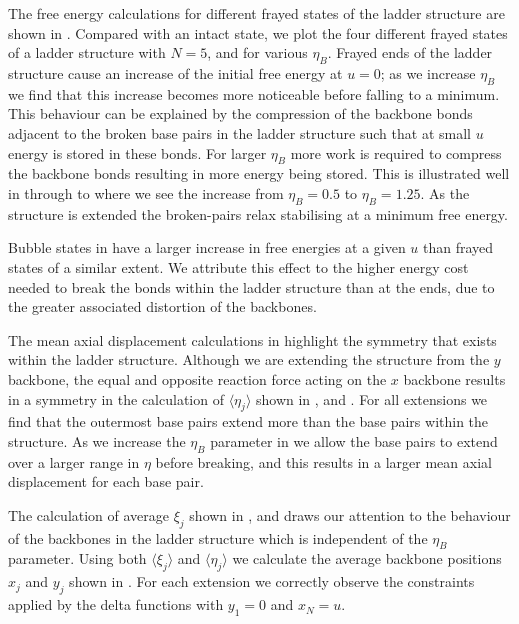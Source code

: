 The free energy calculations for different frayed states of the ladder structure are shown in . Compared with an intact state, we plot the four different frayed states of a ladder structure with $N=5$, and for various $\eta_B$. Frayed ends of the ladder structure cause an increase of the initial free energy at $u=0$; as we increase $\eta_B$ we find that this increase becomes more noticeable before falling to a minimum. This behaviour can be explained by the compression of the backbone bonds adjacent to the broken base pairs in the ladder structure such that at small $u$ energy is stored in these bonds. For larger $\eta_B$ more work is required to compress the backbone bonds resulting in more energy being stored. This is illustrated well in  through to  where we see the increase from $\eta_B=0.5$ to $\eta_B=1.25$. As the structure is extended the broken-pairs relax stabilising at a minimum free energy. 

Bubble states in  have a larger increase in free energies at a given $u$ than frayed states of a similar extent. We attribute this effect to the higher energy cost needed to break the bonds within the ladder structure than at the ends, due to the greater associated distortion of the backbones.

The mean axial displacement calculations in  highlight the symmetry that exists within the ladder structure. Although we are extending the structure from the $y$ backbone, the equal and opposite reaction force acting on the $x$ backbone results in a symmetry in the calculation of $\langle \eta_{j} \rangle$ shown in ,  and . For all extensions we find that the outermost base pairs extend more than the base pairs within the structure. As we increase the $\eta_B$ parameter in  we allow the base pairs to extend over a larger range in $\eta$ before breaking, and this results in a larger mean axial displacement for each base pair.

The calculation of average $\xi_{j}$ shown in ,  and  draws our attention to the behaviour of the backbones in the ladder structure which is independent of the $\eta_B$ parameter. Using both $\langle \xi_{j} \rangle$ and $\langle \eta_{j} \rangle$ we calculate the average backbone positions $x_{j}$ and $y_{j}$ shown in . For each extension we correctly observe the constraints applied by the delta functions with $y_{1}=0$ and $x_{N}=u$.


